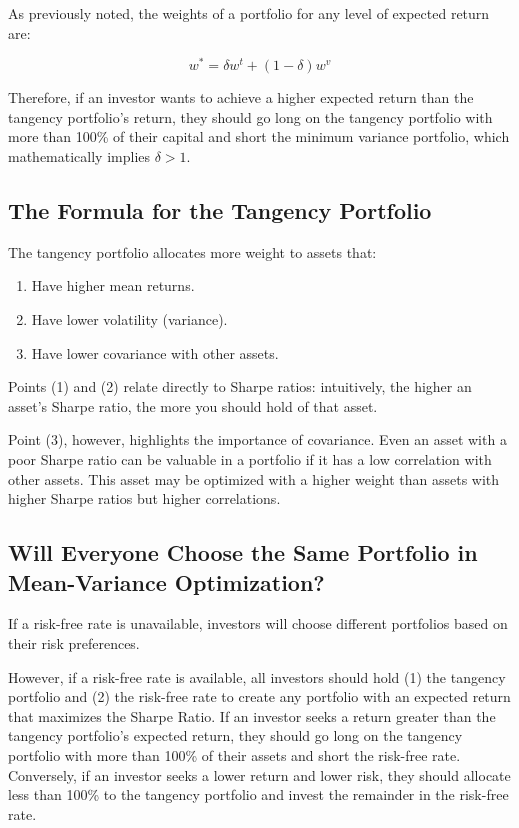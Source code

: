 \documentclass{article}
\begin{document}
As previously noted, the weights of a portfolio for any level of expected return are:

$$
w^{*}={\delta}{w}^{t}+(1-{\delta}){w}^{v}
$$

Therefore, if an investor wants to achieve a higher expected return than the tangency portfolio's return, they should go long on the tangency portfolio with more than 100\% of their capital and short the minimum variance portfolio, which mathematically implies ${\delta}>1$.

\subsection{The Formula for the Tangency Portfolio}
The tangency portfolio allocates more weight to assets that:
\begin{enumerate}
    \item Have higher mean returns.
    \item Have lower volatility (variance).
    \item Have lower covariance with other assets.
\end{enumerate}

Points (1) and (2) relate directly to Sharpe ratios: intuitively, the higher an asset's Sharpe ratio, the more you should hold of that asset.

Point (3), however, highlights the importance of covariance. Even an asset with a poor Sharpe ratio can be valuable in a portfolio if it has a low correlation with other assets. This asset may be optimized with a higher weight than assets with higher Sharpe ratios but higher correlations.

\subsection{Will Everyone Choose the Same Portfolio in Mean-Variance Optimization?}
If a risk-free rate is unavailable, investors will choose different portfolios based on their risk preferences.

However, if a risk-free rate is available, all investors should hold (1) the tangency portfolio and (2) the risk-free rate to create any portfolio with an expected return that maximizes the Sharpe Ratio. If an investor seeks a return greater than the tangency portfolio's expected return, they should go long on the tangency portfolio with more than 100\% of their assets and short the risk-free rate. Conversely, if an investor seeks a lower return and lower risk, they should allocate less than 100\% to the tangency portfolio and invest the remainder in the risk-free rate.
\end{document}
